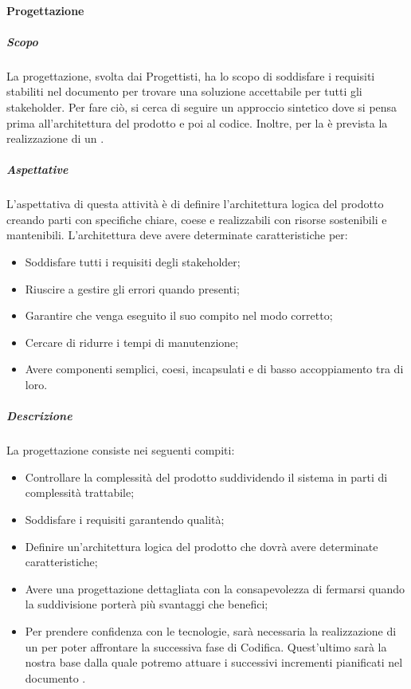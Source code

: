 \paragraph{Progettazione}
\subparagraph*{Scopo}
La progettazione, svolta dai Progettisti, ha lo scopo di soddisfare i requisiti stabiliti nel documento \AdR{} per trovare una soluzione accettabile per tutti gli stakeholder.
Per fare ciò, si cerca di seguire un approccio sintetico dove si pensa prima all’architettura del prodotto e poi al codice. 
Inoltre, per la  è prevista la realizzazione di un .

\subparagraph*{Aspettative}
L'aspettativa di questa attività è di definire l’architettura logica del prodotto creando parti con specifiche chiare, coese e realizzabili con risorse sostenibili e mantenibili. L'architettura deve avere determinate caratteristiche per:
\begin{itemize}
	\item Soddisfare tutti i requisiti degli stakeholder;
	\item Riuscire a gestire gli errori quando presenti;
	\item Garantire che venga eseguito il suo compito nel modo corretto;
	\item Cercare di ridurre i tempi di manutenzione;
	\item Avere componenti semplici, coesi, incapsulati e di basso accoppiamento tra di loro.
\end{itemize}

\subparagraph*{Descrizione}
La progettazione consiste nei seguenti compiti:
\begin{itemize}
	\item Controllare la complessità del prodotto suddividendo il sistema in parti di complessità trattabile;
	\item Soddisfare i requisiti garantendo qualità;
	\item Definire un’architettura logica del prodotto che dovrà avere determinate caratteristiche;
	\item Avere una progettazione dettagliata con la consapevolezza di fermarsi quando la suddivisione porterà più svantaggi che benefici;
	\item Per prendere confidenza con le tecnologie, sarà necessaria la realizzazione di un  per poter affrontare la successiva fase di Codifica. Quest'ultimo sarà la nostra base dalla quale potremo attuare i successivi incrementi pianificati nel documento \PdP{}.
\end{itemize}

